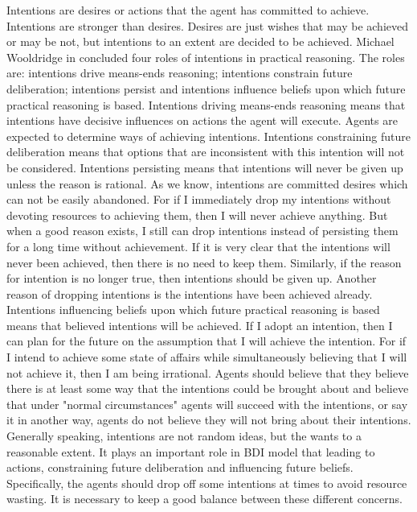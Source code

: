 Intentions are desires or actions that the agent has committed to achieve\cite{Alejandro_LearnBDI_2004}. Intentions are stronger than desires. Desires are just wishes that may be achieved or may be not, but intentions to an extent are decided to be achieved. Michael Wooldridge in \cite{Gerhard_MultiSystem_1999} concluded four roles of intentions in practical reasoning. The roles are: intentions drive means-ends reasoning; intentions constrain future deliberation; intentions persist and intentions influence beliefs upon which future practical reasoning is based. Intentions driving means-ends reasoning means that intentions have decisive influences on actions the agent will execute. Agents are expected to determine ways of achieving intentions. Intentions constraining future deliberation means that options that are inconsistent with this intention will not be considered. Intentions persisting means that intentions will never be given up unless the reason is rational. As we know, intentions are committed desires which can not be easily abandoned. For if I immediately drop my intentions without devoting resources to achieving them, then I will never achieve anything\cite{Gerhard_MultiSystem_1999}. But when a good reason exists, I still can drop intentions instead of persisting them for a long time without achievement. If it is very clear that the intentions will never been achieved, then there is no need to keep them. Similarly, if the reason for intention is no longer true, then intentions should be given up. Another reason of dropping intentions is the intentions have been achieved already. Intentions influencing beliefs upon which future practical reasoning is based means that believed intentions will be achieved. If I adopt an intention, then I can plan for the future on the assumption that I will achieve the intention. For if I intend to achieve some state of affairs while simultaneously believing that I will not achieve it, then I am being irrational\cite{Gerhard_MultiSystem_1999}. Agents should believe that they believe there is at least some way that the intentions could be brought about and believe that under "normal circumstances" agents will succeed with the intentions, or say it in another way, agents do not believe they will not bring about their intentions. Generally speaking, intentions are not random ideas, but the wants to a reasonable extent. It plays an important role in BDI model that leading to actions, constraining future deliberation and influencing future beliefs. Specifically, the agents should drop off some intentions at times to avoid resource wasting. It is necessary to keep a good balance between these different concerns.

